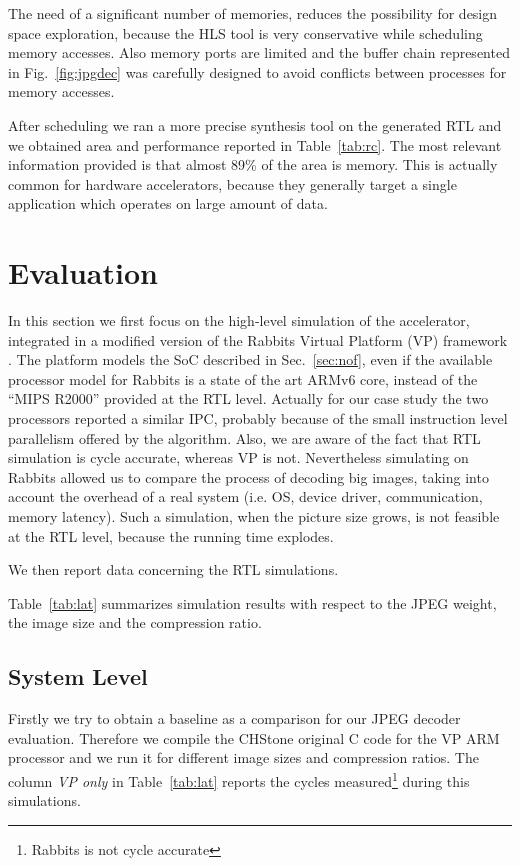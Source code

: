 \documentclass{acm_proc_article-sp}
\begin{document}
The need of a significant number of memories, reduces the possibility for design space
exploration, because the HLS tool is very conservative while scheduling memory accesses.
Also memory ports are limited and the buffer chain represented in Fig.~\ref{fig:jpgdec} was
carefully designed to avoid conflicts between processes for memory accesses.

After scheduling we ran a more precise synthesis tool on the generated RTL and we obtained
area and performance reported in Table~\ref{tab:rc}. The most relevant information provided
is that almost 89\% of the area is memory. This is actually common for hardware accelerators,
because they generally target a single application which operates on large amount of data.

\section{Evaluation}
\label{sec:eval}

In this section we first focus on the high-level simulation of the accelerator,
integrated in a modified version of the Rabbits Virtual Platform (VP) framework
\cite{rabbits, cota}. The platform models the SoC described in Sec.~\ref{sec:nof},
even if the available processor model for Rabbits is a state of the art ARMv6 core,
instead of the ``MIPS R2000'' provided at the RTL level.
Actually for our case study the two processors reported a similar IPC, probably
because of the small instruction level parallelism offered by the algorithm.
Also, we are aware of the fact that RTL simulation is cycle accurate, whereas VP is 
not.
Nevertheless simulating on Rabbits allowed us to compare the process of decoding
big images, taking into account the overhead of a real system (i.e. OS, device driver,
communication, memory latency). Such a simulation, when the picture size grows,
is not feasible at the RTL level, because the running time explodes.

We then report data concerning the RTL simulations.

Table~\ref{tab:lat} summarizes simulation results with respect to the JPEG weight, the image
size and the compression ratio.

\subsection{System Level}

Firstly we try to obtain a baseline as a comparison for our JPEG decoder evaluation.
Therefore we compile the CHStone original C code for the VP ARM processor and we
run it for different image sizes and compression ratios. The column \emph{VP only}
in Table~\ref{tab:lat} reports the cycles measured\footnote{Rabbits is not cycle accurate}
during this simulations.
\end{document}
